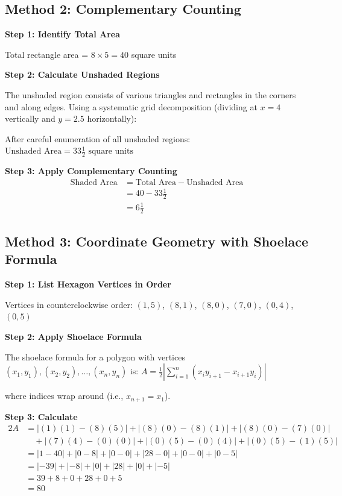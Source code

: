 \documentclass[11pt]{article}
\begin{document}
\subsection*{Method 2: Complementary Counting}

\textbf{Step 1: Identify Total Area}

Total rectangle area = $8 \times 5 = 40$ square units

\textbf{Step 2: Calculate Unshaded Regions}

The unshaded region consists of various triangles and rectangles in the corners and along edges. Using a systematic grid decomposition (dividing at $x=4$ vertically and $y=2.5$ horizontally):

After careful enumeration of all unshaded regions:
$\text{Unshaded Area} = 33\frac{1}{2} \text{ square units}$

\textbf{Step 3: Apply Complementary Counting}
\begin{align*}
\text{Shaded Area} &= \text{Total Area} - \text{Unshaded Area}\\
&= 40 - 33\frac{1}{2}\\
&= 6\frac{1}{2}
\end{align*}

\subsection*{Method 3: Coordinate Geometry with Shoelace Formula}

\textbf{Step 1: List Hexagon Vertices in Order}

Vertices in counterclockwise order: $(1,5)$, $(8,1)$, $(8,0)$, $(7,0)$, $(0,4)$, $(0,5)$

\textbf{Step 2: Apply Shoelace Formula}

The shoelace formula for a polygon with vertices $(x_1,y_1), (x_2,y_2), \ldots, (x_n,y_n)$ is:
$A = \frac{1}{2}\left|\sum_{i=1}^{n} (x_i y_{i+1} - x_{i+1} y_i)\right|$

where indices wrap around (i.e., $x_{n+1} = x_1$).

\textbf{Step 3: Calculate}
\begin{align*}
2A &= |(1)(1) - (8)(5)| + |(8)(0) - (8)(1)| + |(8)(0) - (7)(0)|\\
&\quad + |(7)(4) - (0)(0)| + |(0)(5) - (0)(4)| + |(0)(5) - (1)(5)|\\
&= |1 - 40| + |0 - 8| + |0 - 0| + |28 - 0| + |0 - 0| + |0 - 5|\\
&= |-39| + |-8| + |0| + |28| + |0| + |-5|\\
&= 39 + 8 + 0 + 28 + 0 + 5\\
&= 80
\end{align*}
\end{document}
